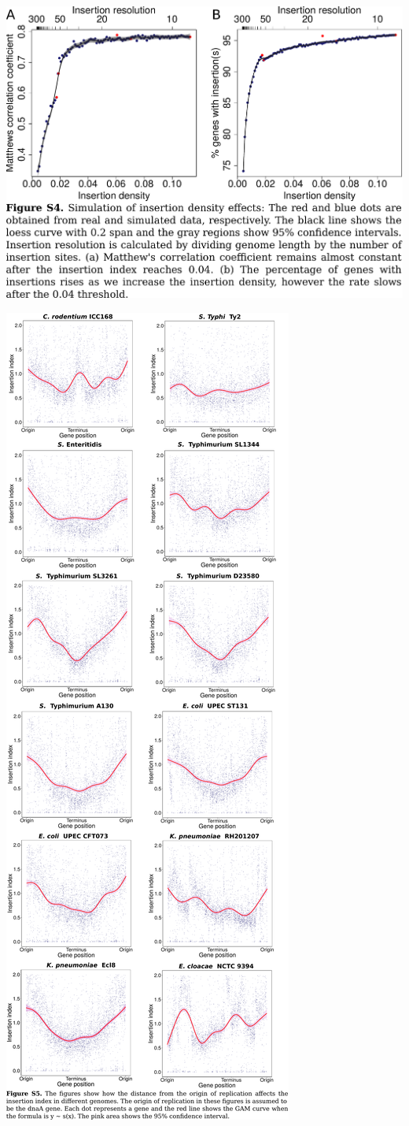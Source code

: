 \documentclass{article}
\newcommand{\Newpage}{\end{preview}\begin{preview}}
\begin{document}
\begin{preview}
\includegraphics{suppl4.pdf}
\Newpage
\includegraphics{suppl5.pdf}

\end{preview}
\end{document}
